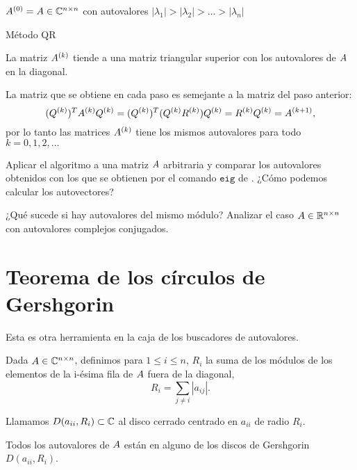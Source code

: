 \begin{algorithm}[H]
\SetAlgoLined
$\Ab^{(0)} = \Ab \in \Cnn$ con autovalores $|\lambda_1| > |\lambda_2| > \dots > |\lambda_n|$\;
 \caption{Método QR}
\end{algorithm}

\begin{prop}
La matriz $\Ab^{(k)}$ tiende a una matriz triangular superior con los autovalores de $\Ab$ en la diagonal.
\end{prop}

\begin{remark} La matriz que se obtiene en cada paso es semejante a la matriz del paso anterior:
$$
(\Qb^{(k)})^T \Ab^{(k)} \Qb^{(k)} = (\Qb^{(k)})^T (\Qb^{(k)} \Rb^{(k)}) \Qb^{(k)} = \Rb^{(k)} \Qb^{(k)} = \Ab^{(k+1)},
$$
por lo tanto las matrices $\Ab^{(k)}$ tiene los mismos autovalores para todo $k = 0, 1, 2, \dots$
\end{remark}

\begin{ejercicio} Aplicar el algoritmo a una matriz $\Ab$ arbitraria y comparar los autovalores obtenidos con los que se obtienen por el comando $\texttt{eig}$ de \python. ¿Cómo podemos calcular los autovectores?
\end{ejercicio}

\begin{ejercicio}
¿Qué sucede si hay autovalores del mismo módulo? Analizar el caso $\Ab \in \Rnn$ con autovalores complejos conjugados.
\end{ejercicio}


\section{Teorema de los círculos de Gershgorin}

Esta es otra herramienta en la caja de los buscadores de autovalores.

Dada $\Ab \in \Cnn$, definimos para $1 \le i \le n$, $R_i$ la suma de los módulos de los elementos de la i-ésima fila de $\Ab$ fuera de la diagonal,
$$
R_i = \sum_{j \neq i} | a_{ij} |.
$$

Llamamos $D(a_{ii}, R_{i}) \subset \mathbb C$ al disco cerrado centrado en $a_{ii}$ de radio $R_{i}$.

\begin{teo} Todos los autovalores de $\Ab$ están en alguno de los discos de Gershgorin $D(a_{ii}, R_{i})$.
\end{teo}




